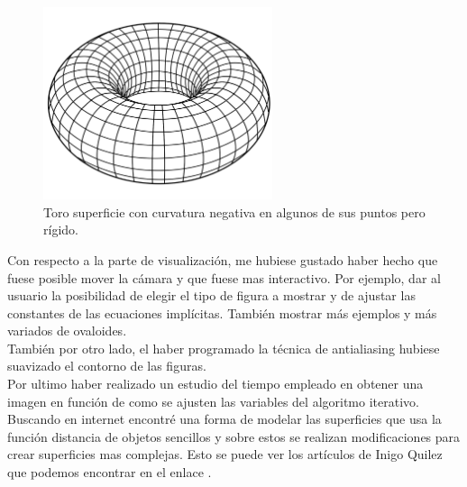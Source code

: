 	\begin{figure}[h]
		\begin{center}
			\includegraphics[width=0.6\textwidth]{imagenes/toro.png}
		\end{center}
		\caption{Toro superficie con curvatura negativa en algunos de sus puntos pero rígido.}
		\label{fig:etiq_21}
	\end{figure}


Con respecto a la parte de visualización, me hubiese gustado haber hecho que fuese posible mover la cámara y que fuese mas interactivo. Por ejemplo, dar al usuario la posibilidad de elegir el tipo de figura a mostrar y de ajustar las constantes de las ecuaciones implícitas. También mostrar más ejemplos y más variados de ovaloides.
${ }$\\

También por otro lado, el haber programado la técnica de antialiasing hubiese suavizado el contorno de las figuras.
${ }$\\

Por ultimo haber realizado un estudio del tiempo empleado en obtener una imagen en función de como se ajusten las variables del algoritmo iterativo.
${ }$\\

Buscando en internet encontré una forma de modelar las superficies que usa la función distancia de objetos sencillos y sobre estos se realizan modificaciones para crear superficies mas complejas. Esto se puede ver los artículos de Inigo Quilez que podemos encontrar en el enlace \cite{IQuilez}.


